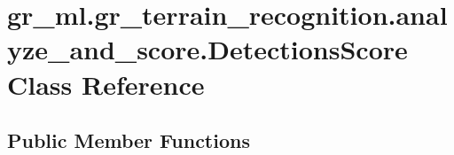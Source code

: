 \hypertarget{classgr__ml_1_1gr__terrain__recognition_1_1analyze__and__score_1_1DetectionsScore}{}\section{gr\+\_\+ml.\+gr\+\_\+terrain\+\_\+recognition.\+analyze\+\_\+and\+\_\+score.\+Detections\+Score Class Reference}
\label{classgr__ml_1_1gr__terrain__recognition_1_1analyze__and__score_1_1DetectionsScore}
\subsection*{Public Member Functions}
